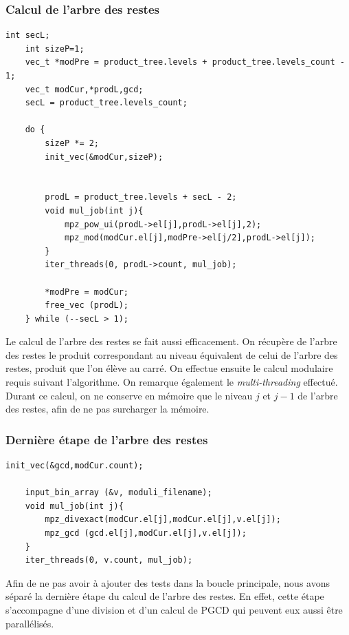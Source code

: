 \subsubsection{Calcul de l'arbre des restes}

\begin{lstlisting}[style=customc,caption=fact\_superspeed.c - partie 3, label=fact3]
	int secL;
	int sizeP=1; 
	vec_t *modPre = product_tree.levels + product_tree.levels_count - 1;
	vec_t modCur,*prodL,gcd;
	secL = product_tree.levels_count;
	
	do {
		sizeP *= 2; 
		init_vec(&modCur,sizeP);	
	

		prodL = product_tree.levels + secL - 2;
		void mul_job(int j){			
			mpz_pow_ui(prodL->el[j],prodL->el[j],2); 
			mpz_mod(modCur.el[j],modPre->el[j/2],prodL->el[j]); 	
		}
		iter_threads(0, prodL->count, mul_job);
		
		*modPre = modCur;
		free_vec (prodL);	
	} while (--secL > 1);

\end{lstlisting}

Le calcul de l'arbre des restes se fait aussi efficacement. On récupère de l'arbre des restes le produit correspondant au niveau équivalent de celui de l'arbre des restes, produit que l'on élève au carré. On effectue ensuite le calcul modulaire requis suivant l'algorithme. On remarque également le \textit{multi-threading} effectué. Durant ce calcul, on ne conserve en mémoire que le niveau $j$ et $j-1$ de l'arbre des restes, afin de ne pas surcharger la mémoire. \\



\subsubsection{Dernière étape de l'arbre des restes}

\begin{lstlisting}[style=customc,caption=fact\_superspeed.c - partie 4, label=fact4]
init_vec(&gcd,modCur.count);
	
	input_bin_array (&v, moduli_filename);
	void mul_job(int j){
		mpz_divexact(modCur.el[j],modCur.el[j],v.el[j]); 
		mpz_gcd (gcd.el[j],modCur.el[j],v.el[j]); 
	}
	iter_threads(0, v.count, mul_job);
\end{lstlisting}

Afin de ne pas avoir à ajouter des tests dans la boucle principale, nous avons séparé la dernière étape du calcul de l'arbre des restes. En effet, cette étape s'accompagne d'une division et d'un calcul de PGCD qui peuvent eux aussi être parallélisés. \\





